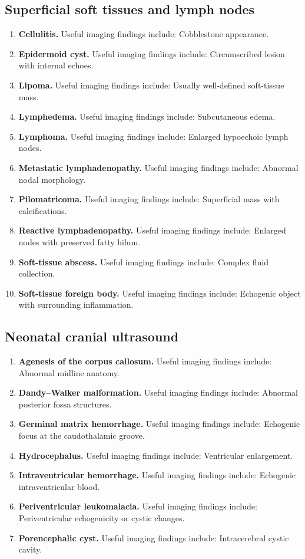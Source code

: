 \subsection{Superficial soft tissues and lymph nodes}
\begin{enumerate}[leftmargin=*,itemsep=0.45em,topsep=0.4em]
\item \textbf{Cellulitis.} Useful imaging findings include: Cobblestone appearance.
\item \textbf{Epidermoid cyst.} Useful imaging findings include: Circumscribed lesion with internal echoes.
\item \textbf{Lipoma.} Useful imaging findings include: Usually well-defined soft-tissue mass.
\item \textbf{Lymphedema.} Useful imaging findings include: Subcutaneous edema.
\item \textbf{Lymphoma.} Useful imaging findings include: Enlarged hypoechoic lymph nodes.
\item \textbf{Metastatic lymphadenopathy.} Useful imaging findings include: Abnormal nodal morphology.
\item \textbf{Pilomatricoma.} Useful imaging findings include: Superficial mass with calcifications.
\item \textbf{Reactive lymphadenopathy.} Useful imaging findings include: Enlarged nodes with preserved fatty hilum.
\item \textbf{Soft-tissue abscess.} Useful imaging findings include: Complex fluid collection.
\item \textbf{Soft-tissue foreign body.} Useful imaging findings include: Echogenic object with surrounding inflammation.
\end{enumerate}

\subsection{Neonatal cranial ultrasound}
\begin{enumerate}[leftmargin=*,itemsep=0.45em,topsep=0.4em]
\item \textbf{Agenesis of the corpus callosum.} Useful imaging findings include: Abnormal midline anatomy.
\item \textbf{Dandy--Walker malformation.} Useful imaging findings include: Abnormal posterior fossa structures.
\item \textbf{Germinal matrix hemorrhage.} Useful imaging findings include: Echogenic focus at the caudothalamic groove.
\item \textbf{Hydrocephalus.} Useful imaging findings include: Ventricular enlargement.
\item \textbf{Intraventricular hemorrhage.} Useful imaging findings include: Echogenic intraventricular blood.
\item \textbf{Periventricular leukomalacia.} Useful imaging findings include: Periventricular echogenicity or cystic changes.
\item \textbf{Porencephalic cyst.} Useful imaging findings include: Intracerebral cystic cavity.
\end{enumerate}

